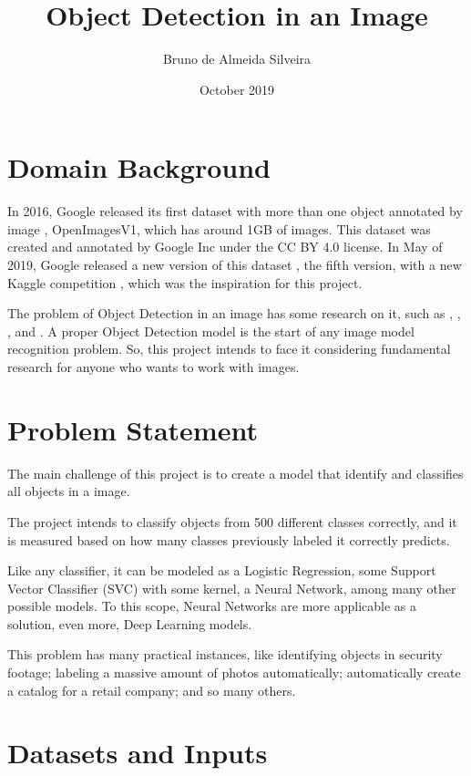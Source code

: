 \documentclass[11pt, a4paper, twocolumn]{article}
\title{\textbf{Object Detection in an Image}}
\author{Bruno de Almeida Silveira}
\date{October 2019}
\begin{document}
\maketitle

\section{Domain Background}

In 2016, Google released its first dataset with more than one object annotated by image \cite{google:1}, OpenImagesV1, which has around 1GB of images. This dataset was created and annotated by Google Inc under the CC BY 4.0 license.  In May of 2019, Google released a new version of this dataset \cite{google:2}, the fifth version, with a new Kaggle competition \cite{kaggle}, which was the inspiration for this project.

The problem of Object Detection in an image has some research on it, such as \cite{intro:1}, \cite{intro:2}, \cite{intro:3}, and \cite{intro:4}. A proper Object Detection model is the start of any image model recognition problem. So, this project intends to face it considering fundamental research for anyone who wants to work with images.

\section{Problem Statement}

The main challenge of this project is to create a model that identify and classifies all objects in a image.

The project intends to classify objects from 500 different classes correctly, and it is measured based on how many classes previously labeled it correctly predicts.

Like any classifier, it can be modeled as a Logistic Regression, some Support Vector Classifier (SVC) with some kernel, a Neural Network, among many other possible models. To this scope, Neural Networks are more applicable as a solution, even more, Deep Learning models.

This problem has many practical instances, like identifying objects in security footage; labeling a massive amount of photos automatically; automatically create a catalog for a retail company; and so many others.

\section{Datasets and Inputs}
\end{document}
